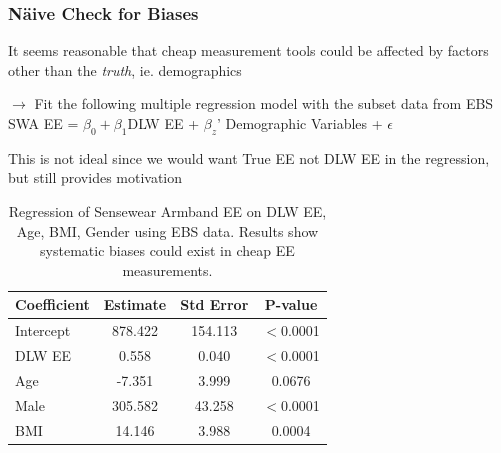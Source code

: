 \documentclass[handout]{beamer}\usepackage[]{graphicx}\usepackage[]{color}
\begin{document}
\begin{frame}
\frametitle{N{\"a}ive Check for Biases}
It seems reasonable that cheap measurement tools could be affected by factors other than the \emph{truth}, ie. demographics \\

\vspace{0.3cm}

$\rightarrow$ Fit the following multiple regression model with the subset data from EBS\\
SWA EE = $\beta_0 + \beta_1$DLW EE + $\beta_z$' Demographic Variables + $\epsilon$ \\

\vspace{0.3cm}

This is not ideal since we would want True EE not DLW EE in the regression, but still provides motivation


\end{frame}

\begin{frame}

\begin{table} \centering 
  \caption{Regression of Sensewear Armband EE on DLW EE, Age, BMI, Gender using EBS data. Results show systematic biases could exist in cheap EE measurements.} 
\begin{tabular}{l|ccc}
\hline
Coefficient & Estimate & Std Error & P-value \\
\hline
Intercept & 878.422 & 154.113 & $<$0.0001 \\
DLW EE & 0.558 & 0.040 & $<$0.0001 \\
Age & -7.351 & 3.999 & 0.0676 \\
Male & 305.582 & 43.258 & $<$0.0001 \\
BMI & 14.146 & 3.988 & 0.0004 \\
\hline
\end{tabular} 
\end{table} 
\end{frame}
\end{document}
